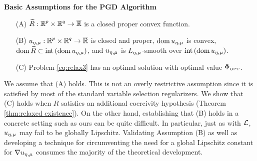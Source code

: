 \noindent
{\bf Basic Assumptions for the PGD Algorithm}
\begin{enumerate}
\item[(A)] ${\widetilde R}:{\operatorname{\mathbb{R}}^p}\times{\operatorname{\mathbb{R}}^q}\rightarrow {\overline{\operatorname{\mathbb{R}}}}$ is a closed proper convex function.
\item[(B)] ${u_{\eta,\mu}}:{\operatorname{\mathbb{R}}^p}\times{\operatorname{\mathbb{R}}^q}\rightarrow {\overline{\operatorname{\mathbb{R}}}}$ is closed and proper, 
$\operatorname{\mathrm{dom}}{{u_{\eta,\mu}}}$ is
convex, $\operatorname{\mathrm{dom}}{{\widetilde R}}\subset\mathrm{int}\left( \operatorname{\mathrm{dom}}{{u_{\eta,\mu}}}\right)$, and
${u_{\eta,\mu}}$ is $L_{\eta,\mu}$-smooth over $\mathrm{int}\left( \operatorname{\mathrm{dom}}{{u_{\eta,\mu}}}\right)$.
\item[(C)] Problem \eqref{eq:relax3} has an optimal solution with optimal 
value $\Phi_{\mbox{\tiny OPT}}$.
\end{enumerate}

\noindent
We assume that (A) holds. This is not an overly
restrictive assumption since it is satisfied by most of the standard
variable selection regularizers.
We show that (C) holds when $R$ satisfies
an additional coercivity hypothesis (Theorem \ref{thm:relaxed existence}). 
On the other hand, establishing that (B) holds
in a concrete setting such as ours
can be quite difficult. 
In particular, just as with $\operatorname{\mathcal{L}}$, ${u_{\eta,\mu}}$ may fail to be globally Lipschitz.
Validating Assumption (B) as well as developing a technique for circumventing
the need for a global Lipschitz constant for $\nabla{u_{\eta,\mu}}$ 
consumes the majority of the theoretical development. 



